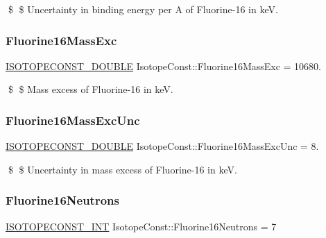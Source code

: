 \$ \$ Uncertainty in binding energy per A of Fluorine-\/16 in keV. \mbox{\label{group___isotope_const-_fluorine-_f16_ga67073a77a47e06926b4980cd7f4dee1d}} 
\subsubsection{\texorpdfstring{Fluorine16\+Mass\+Exc}{Fluorine16MassExc}}
{\footnotesize\ttfamily \mbox{\hyperlink{group___isotope_const-_macros_ga8f45a7272ce02c0b4c65c44636ed719a}{I\+S\+O\+T\+O\+P\+E\+C\+O\+N\+S\+T\+\_\+\+D\+O\+U\+B\+LE}} Isotope\+Const\+::\+Fluorine16\+Mass\+Exc = 10680.}

\$ \$ Mass excess of Fluorine-\/16 in keV. \mbox{\label{group___isotope_const-_fluorine-_f16_ga376ba3bd52de78d25716b9a1053fd64b}} 
\subsubsection{\texorpdfstring{Fluorine16\+Mass\+Exc\+Unc}{Fluorine16MassExcUnc}}
{\footnotesize\ttfamily \mbox{\hyperlink{group___isotope_const-_macros_ga8f45a7272ce02c0b4c65c44636ed719a}{I\+S\+O\+T\+O\+P\+E\+C\+O\+N\+S\+T\+\_\+\+D\+O\+U\+B\+LE}} Isotope\+Const\+::\+Fluorine16\+Mass\+Exc\+Unc = 8.}

\$ \$ Uncertainty in mass excess of Fluorine-\/16 in keV. \mbox{\label{group___isotope_const-_fluorine-_f16_ga031c2c2c97801d5398bf8ad81e678dac}} 
\subsubsection{\texorpdfstring{Fluorine16\+Neutrons}{Fluorine16Neutrons}}
{\footnotesize\ttfamily \mbox{\hyperlink{group___isotope_const-_macros_ga5f18360b3e99483a35c32d789e62621c}{I\+S\+O\+T\+O\+P\+E\+C\+O\+N\+S\+T\+\_\+\+I\+NT}} Isotope\+Const\+::\+Fluorine16\+Neutrons = 7}


